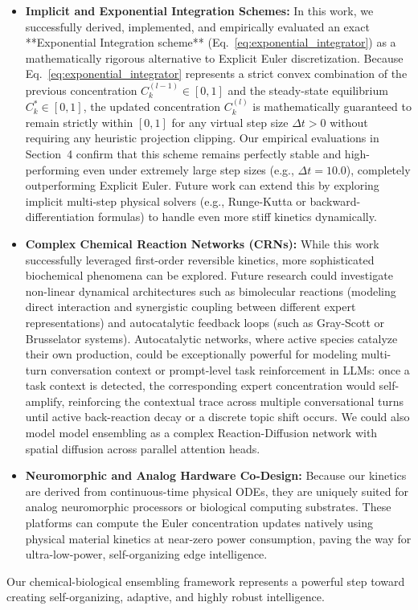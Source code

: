 \begin{itemize}
    \item \textbf{Implicit and Exponential Integration Schemes:} In this work, we successfully derived, implemented, and empirically evaluated an exact **Exponential Integration scheme** (Eq.~\ref{eq:exponential_integrator}) as a mathematically rigorous alternative to Explicit Euler discretization. Because Eq.~\ref{eq:exponential_integrator} represents a strict convex combination of the previous concentration $C_k^{(l-1)} \in [0, 1]$ and the steady-state equilibrium $C_k^* \in [0, 1]$, the updated concentration $C_k^{(l)}$ is mathematically guaranteed to remain strictly within $[0, 1]$ for any virtual step size $\Delta t > 0$ without requiring any heuristic projection clipping. Our empirical evaluations in Section~4 confirm that this scheme remains perfectly stable and high-performing even under extremely large step sizes (e.g., $\Delta t = 10.0$), completely outperforming Explicit Euler. Future work can extend this by exploring implicit multi-step physical solvers (e.g., Runge-Kutta or backward-differentiation formulas) to handle even more stiff kinetics dynamically.
    \item \textbf{Complex Chemical Reaction Networks (CRNs):} While this work successfully leveraged first-order reversible kinetics, more sophisticated biochemical phenomena can be explored. Future research could investigate non-linear dynamical architectures such as bimolecular reactions (modeling direct interaction and synergistic coupling between different expert representations) and autocatalytic feedback loops (such as Gray-Scott or Brusselator systems). Autocatalytic networks, where active species catalyze their own production, could be exceptionally powerful for modeling multi-turn conversation context or prompt-level task reinforcement in LLMs: once a task context is detected, the corresponding expert concentration would self-amplify, reinforcing the contextual trace across multiple conversational turns until active back-reaction decay or a discrete topic shift occurs. We could also model model ensembling as a complex Reaction-Diffusion network with spatial diffusion across parallel attention heads.
    \item \textbf{Neuromorphic and Analog Hardware Co-Design:} Because our kinetics are derived from continuous-time physical ODEs, they are uniquely suited for analog neuromorphic processors or biological computing substrates. These platforms can compute the Euler concentration updates natively using physical material kinetics at near-zero power consumption, paving the way for ultra-low-power, self-organizing edge intelligence.
\end{itemize}
Our chemical-biological ensembling framework represents a powerful step toward creating self-organizing, adaptive, and highly robust intelligence.

